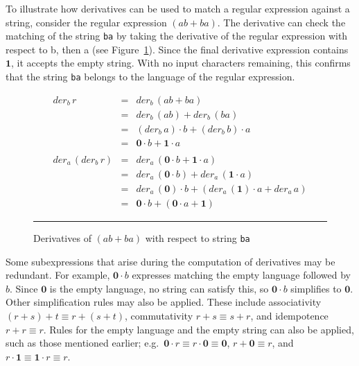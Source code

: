 \documentclass[12pt]{article}
\newcommand{\ZERO}{\textbf{0}}
\newcommand{\ONE}{\textbf{1}}
\newcommand{\der}{\textit{der}}
\begin{document}
To illustrate how derivatives can be used to match a regular expression against a string, consider the regular expression $( ab + ba )$. 
The derivative can check the matching of the string \texttt{ba} by taking the derivative of the regular expression with respect to b,
then a (see Figure~\ref{derivative}). Since the final derivative expression contains $\ONE$, it accepts the empty string. With no input
characters remaining, this confirms that the string \texttt{ba} belongs to the language of the
regular expression.


\begin{figure}[ht]
  \begin{center}
    

\[
\begin{array}{rcl}
\der_b\, r           & =           &  \der_b\, (ab + ba) \\
                     & =           & \der_b\, (ab) + \der_b\, (ba) \\
                     & =           & (\der_b\, a) \cdot b + (\der_b\, b) \cdot a  \\
                     & =           & \ZERO \cdot b + \ONE \cdot a \\\\

\der_a\, (\der_b\, r) & =           & \der_a\, (\ZERO \cdot b + \ONE \cdot a)\\
                      & =           & \der_a\, (\ZERO \cdot b) + \der_a\, (\ONE \cdot a)\\
                      & =           & \der_a\, (\ZERO) \cdot b + (\der_a\, (\ONE) \cdot a + \der_a\, a)\\
                      & =           & \ZERO \cdot b + (\ZERO \cdot a + \ONE )
\end{array}
\]
    \mbox{}
    \rule{\linewidth}{0.4pt}
\caption{Derivatives of $(ab+ba)$ with respect to string \texttt{ba}}\label{derivative}
  \end{center}
\end{figure}

Some subexpressions that arise during the computation of derivatives may be
redundant. For example, $\ZERO \cdot b$ expresses matching the empty language
followed by $b$. Since $\ZERO$ is the empty language, no string can satisfy
this, so $\ZERO \cdot b$ simplifies to $\ZERO$. Other simplification rules may also be applied. These include associativity
$(r+s)+t \equiv r+(s+t)$, commutativity $r+s \equiv s+r$, and idempotence
$r+r \equiv r$. Rules for the empty language and the empty string can also be
applied, such as those mentioned earlier; e.g.\ $\ZERO \cdot r \equiv r \cdot
\ZERO \equiv \ZERO$, $r+\ZERO \equiv r$, and $r \cdot \ONE \equiv \ONE \cdot r
\equiv r$.  
\end{document}
